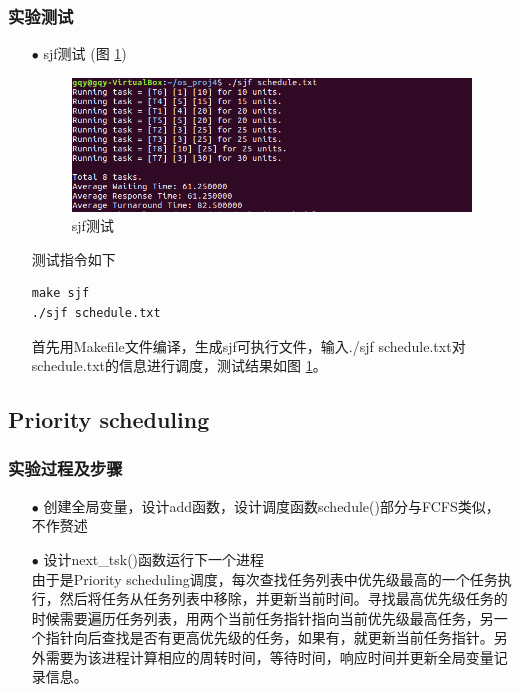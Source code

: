 \documentclass{article}
\begin{document}
\subsubsection{实验测试}
\begin{itemize}
\item[$\bullet$]sjf测试 (图 \ref{sjf测试})
\begin{figure}[htbp]
		\centering
		\includegraphics{sjf}
		\caption{sjf测试} \label{sjf测试}
\end{figure}

测试指令如下
\begin{lstlisting}[language={[ANSI]C}]
make sjf
./sjf schedule.txt
\end{lstlisting}
首先用Makefile文件编译，生成sjf可执行文件，输入./sjf schedule.txt对schedule.txt的信息进行调度，测试结果如图 \ref{sjf测试}。
\end{itemize}
\subsection{Priority scheduling}
\subsubsection{实验过程及步骤}
\begin{itemize}
\item[$\bullet$]创建全局变量，设计add函数，设计调度函数schedule()部分与FCFS类似，不作赘述
\item[$\bullet$]设计next\_tsk()函数运行下一个进程\\
由于是Priority scheduling调度，每次查找任务列表中优先级最高的一个任务执行，然后将任务从任务列表中移除，并更新当前时间。寻找最高优先级任务的时候需要遍历任务列表，用两个当前任务指针指向当前优先级最高任务，另一个指针向后查找是否有更高优先级的任务，如果有，就更新当前任务指针。另外需要为该进程计算相应的周转时间，等待时间，响应时间并更新全局变量记录信息。
\end{itemize}
\end{document}
